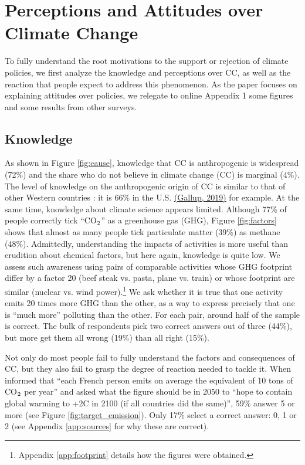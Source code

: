 \documentclass[english,5p,authoryear]{elsarticle}
\begin{document}
\section{Perceptions and Attitudes over Climate Change\label{sec:attitudes_climate_change}}
    
To fully understand the root motivations to the support or rejection of climate policies, we first analyze the knowledge and perceptions over CC, as well as the reaction that people expect to address this phenomenon. As the paper focuses on explaining attitudes over policies, we relegate to online Appendix 1 some figures and some results from other surveys.
    
    \subsection{Knowledge\label{subsec:knowledge}}
%
As shown in Figure \ref{fig:cause}, knowledge that CC is anthropogenic is widespread (72\%) and the share who do not believe in climate change (CC) is marginal (4\%). The level of knowledge on the anthropogenic origin of CC is similar to that of other Western countries \citep{leiserowitz_international_2007,lee_predictors_2015,stokes_global_2015-1}: it is 66\% in the U.S. \href{https://news.gallup.com/poll/1615/environment.aspx}{(Gallup, 2019)} for example. At the same time, knowledge about climate science appears limited. Although 77\% of people correctly tick ``CO$_\textnormal{2}$'' as a greenhouse gas (GHG), Figure \ref{fig:factors} shows that almost as many people tick particulate matter (39\%) as methane (48\%). Admittedly, understanding the impacts of activities is more useful than erudition about chemical factors, but here again, knowledge is quite low. We assess such awareness using pairs of comparable activities whose GHG footprint differ by a factor 20 (beef steak vs. pasta, plane vs. train) or whose footprint are similar (nuclear vs. wind power).\footnote{Appendix \ref{app:footprint} details how the figures were obtained.} We ask whether it is true that one activity emits 20 times more GHG than the other, as a way to express precisely that one is ``much more'' polluting than the other. For each pair, around half of the sample is correct. The bulk of respondents pick two correct answers out of three (44\%), but more get them all wrong (19\%) than all right (15\%). 

Not only do most people fail to fully understand the factors and consequences of CC, but they also fail to grasp the degree of reaction needed to tackle it. When informed that ``each French person emits on average the equivalent of 10 tons of CO$_\textnormal{2}$ per year'' and asked what the figure should be in 2050 to ``hope to contain global warming to +2\textdegree{}C in 2100 (if all countries did the same)'', 59\% answer 5 or more (see Figure \ref{fig:target_emission}). Only 17\% select a correct answer: 0, 1 or 2 (see Appendix \ref{app:sources} for why these are correct).
\end{document}
